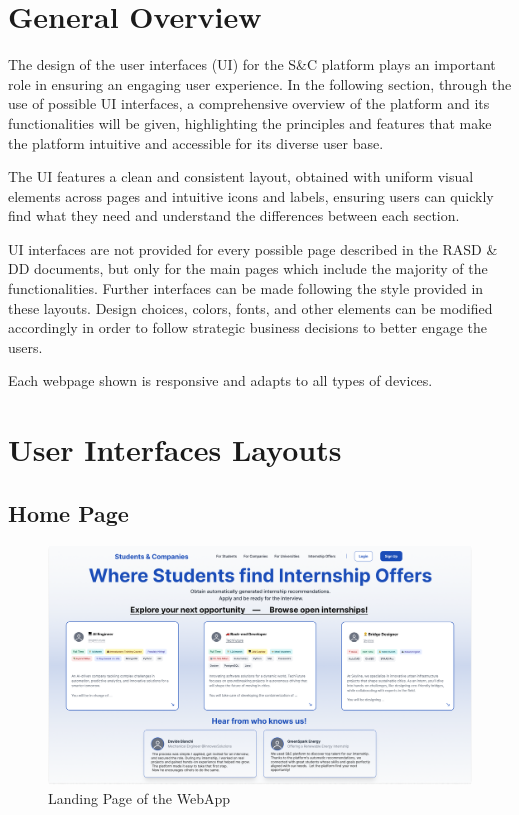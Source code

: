 \section{General Overview}
\label{sec: general_overview}

The design of the user interfaces (UI) for the S\&C platform plays an important role in ensuring an engaging user experience. In the following section, through the use of possible UI interfaces, a comprehensive overview of the platform and its functionalities will be given, highlighting the principles and features that make the platform intuitive and accessible for its diverse user base.

The UI features a clean and consistent layout, obtained with uniform visual elements across pages and intuitive icons and labels, ensuring users can quickly find what they need and understand the differences between each section.

UI interfaces are not provided for every possible page described in the RASD \& DD documents, but only for the main pages which include the majority of the functionalities. Further interfaces can be made following the style provided in these layouts. Design choices, colors, fonts, and other elements can be modified accordingly in order to follow strategic business decisions to better engage the users.

Each webpage shown is responsive and adapts to all types of devices.

\newpage

\section{User Interfaces Layouts}
\label{sec: ui_layouts}

\subsection{Home Page}
\label{subsec: home_page}

\begin{figure} [H]
    \begin{center}
        \includegraphics[width=0.9\linewidth]{LaTeXCode/images/UI/Homepage - Student.png}
        \caption{Landing Page of the WebApp}
        \label{fig: homepage}
    \end{center}
\end{figure}

